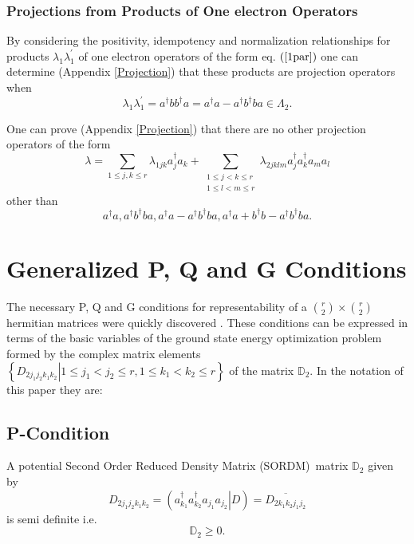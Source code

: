 \documentclass[aps,preprint,amsfonts,amssymb,showpacs,showkeys]{revtex4}%
\begin{document}
\subsubsection{Projections from Products of One electron Operators}

By considering the positivity, idempotency and normalization relationships for
products $\lambda_{1}\lambda_{1}^{\prime}$ of one electron operators of the
form eq. $\left(  \ref{1par}\right)  $ one can determine (Appendix
\ref{Projection}) that these products are projection operators when
\begin{equation}
\lambda_{1}\lambda_{1}^{\prime}=a^{\dagger}bb^{\dagger}a=a^{\dagger
}a-a^{\dagger}b^{\dagger}ba\in\Lambda_{2}.
\end{equation}


One can prove (Appendix \ref{Projection}) that there are no other projection
operators of the form
\begin{equation}
\lambda=\sum_{1\leq j,k\leq r}\lambda_{1jk}a_{j}^{\dagger}a_{k}+\sum
_{\substack{1\leq j<k\leq r\\1\leq l<m\leq r}}\lambda_{2jklm}a_{j}^{\dagger
}a_{k}^{\dagger}a_{m}a_{l}%
\end{equation}
other than
\begin{equation}
a^{\dagger}a,a^{\dagger}b^{\dagger}ba,a^{\dagger}a-a^{\dagger}b^{\dagger
}ba,a^{\dagger}a+b^{\dagger}b-a^{\dagger}b^{\dagger}ba.
\end{equation}


\section{Generalized P, Q and G Conditions \label{PQG}}

The necessary P, Q and G conditions for representability of a $\binom{r}%
{2}\times\binom{r}{2}$ hermitian matrices were quickly discovered \cite{PQG}.
These conditions can be expressed in terms of the basic variables of the
ground state energy optimization problem formed by the complex matrix elements
$\left\{  \left.  D_{2j_{1}j_{2}k_{1}k_{2}}\right\vert 1\leq j_{1}<j_{2}\leq
r,1\leq k_{1}<k_{2}\leq r\right\}  $ of the matrix $\mathbb{D}_{2}$. In the
notation of this paper they are:

\subsection{P-Condition}

A potential Second Order Reduced Density Matrix (SORDM)\ matrix $\mathbb{D}%
_{2}$ given by
\begin{equation}
D_{2j_{1}j_{2}k_{1}k_{2}}=\left(  \left.  a_{k_{1}}^{\dagger}a_{k_{2}%
}^{\dagger}a_{j_{1}}a_{j_{2}}\right\vert D\right)  =\overline{D_{2k_{1}%
k_{2}j_{1}j_{2}}}%
\end{equation}
is semi definite i.e.
\begin{equation}
\mathbb{D}_{2}\geq0.
\end{equation}
\end{document}
